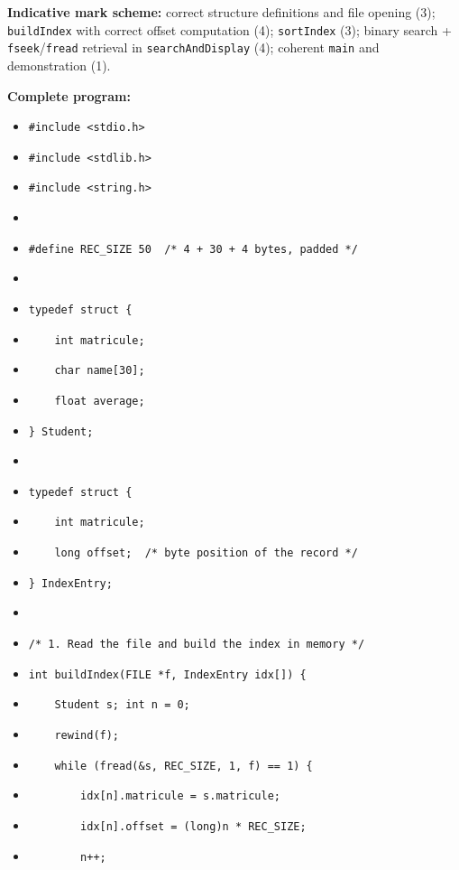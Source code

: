 \documentclass[11pt]{article}
\begin{document}
\begin{corrige}
\textbf{Indicative mark scheme:} correct structure definitions and file opening (3); \texttt{buildIndex} with correct offset computation (4); \texttt{sortIndex} (3); binary search + \texttt{fseek}/\texttt{fread} retrieval in \texttt{searchAndDisplay} (4); coherent \texttt{main} and demonstration (1).

\textbf{Complete program:}
\begin{itemize}
\item[] \texttt{\#include <stdio.h>}
\item[] \texttt{\#include <stdlib.h>}
\item[] \texttt{\#include <string.h>}
\item[] \texttt{}
\item[] \texttt{\#define REC\_SIZE 50\ \ /* 4 + 30 + 4 bytes, padded */}
\item[] \texttt{}
\item[] \texttt{typedef struct \{}
\item[] \texttt{\ \ \ \ int matricule;}
\item[] \texttt{\ \ \ \ char name[30];}
\item[] \texttt{\ \ \ \ float average;}
\item[] \texttt{\} Student;}
\item[] \texttt{}
\item[] \texttt{typedef struct \{}
\item[] \texttt{\ \ \ \ int matricule;}
\item[] \texttt{\ \ \ \ long offset;\ \ /* byte position of the record */}
\item[] \texttt{\} IndexEntry;}
\item[] \texttt{}
\item[] \texttt{/* 1. Read the file and build the index in memory */}
\item[] \texttt{int buildIndex(FILE *f, IndexEntry idx[]) \{}
\item[] \texttt{\ \ \ \ Student s; int n = 0;}
\item[] \texttt{\ \ \ \ rewind(f);}
\item[] \texttt{\ \ \ \ while (fread(\&s, REC\_SIZE, 1, f) == 1) \{}
\item[] \texttt{\ \ \ \ \ \ \ \ idx[n].matricule = s.matricule;}
\item[] \texttt{\ \ \ \ \ \ \ \ idx[n].offset = (long)n * REC\_SIZE;}
\item[] \texttt{\ \ \ \ \ \ \ \ n++;}

\end{itemize}
\end{corrige}
\end{document}
